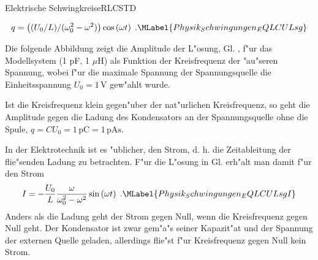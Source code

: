 \begin{MXContent}{Elektrische Schwingkreise}{RLC}{STD}
\begin{MInfo}
\begin{equation}
  q = \left((U_0/L)/(\omega_0^2-\omega^2)\right) \cos\left(\omega t\right) \; .\MLabel{Physik_Schwingungen_EQLCULsg}
\end{equation}

\end{MInfo}


\begin{MExample}
Die folgende Abbildung zeigt die Amplitude der L"osung, Gl. , f"ur das Modellsystem (1 pF, 1 $\mu$H) als Funktion der Kreisfrequenz der "au"seren Spannung, wobei f"ur die maximale Spannung der Spannungsquelle die Einheitsspannung $U_0=1 \,\text{V}$ gew"ahlt wurde.

\begin{center}
\end{center}

Ist die Kreisfrequenz klein gegen"uber der nat"urlichen Kreisfrequenz, so geht die Amplitude gegen die Ladung des Kondensators an der Spannungsquelle ohne die Spule, $q = C U_0 = 1\,\text{pC}= 1\,\text{pAs}$.

\end{MExample}

In der Elektrotechnik ist es "ublicher, den Strom, d. h. die Zeitableitung der flie"senden Ladung zu betrachten. F"ur die L"osung in Gl.  erh"alt man damit f"ur den Strom
\begin{equation}
  I = -\frac{U_0}{L}\frac{\omega}{\omega_0^2-\omega^2} \sin\left(\omega t\right) \; .\MLabel{Physik_Schwingungen_EQLCULsgI}
\end{equation}
Anders als die Ladung geht der Strom gegen Null, wenn die Kreisfrequenz gegen Null geht. Der Kondensator ist zwar gem"a"s seiner Kapazit"at und der Spannung der externen Quelle geladen, allerdings flie"st f"ur Kreisfrequenz gegen Null kein Strom.

\begin{MExample}

\begin{center}
\end{center}


\end{MExample}
\end{MXContent}
